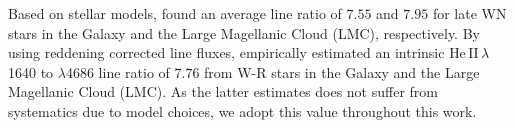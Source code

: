 \documentclass[]{aastex63}
\begin{document}
Based on stellar models, \citet{schaerer_new_1998} found an average line ratio of $7.55$ and $7.95$ for late WN stars in the Galaxy and the Large Magellanic Cloud (LMC), respectively.
By using reddening corrected line fluxes, \citet{leitherer_he_2019} empirically estimated an intrinsic He\,II\,$\lambda$1640 to $\lambda$4686 line ratio of $7.76$ from W-R stars in the Galaxy and the Large Magellanic Cloud (LMC). As the latter estimates does not suffer from systematics due to model choices, we adopt this value throughout this work.

\end{document}
